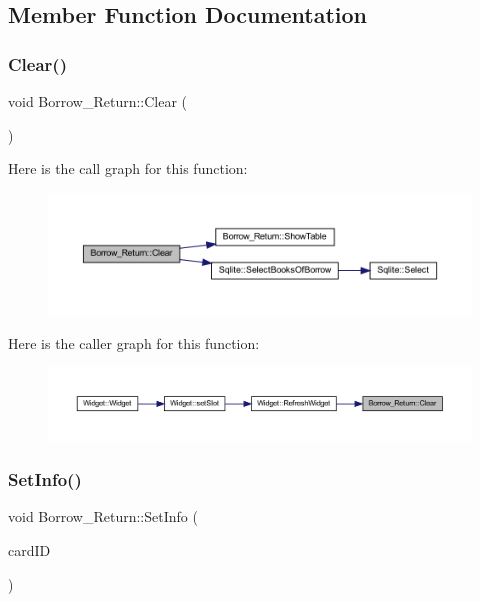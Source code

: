 \subsection{Member Function Documentation}
\mbox{\label{class_borrow___return_a65b8b7b7c224f0747c4330fb9aa6fdce}} 
\subsubsection{\texorpdfstring{Clear()}{Clear()}}
{\footnotesize\ttfamily void Borrow\+\_\+\+Return\+::\+Clear (\begin{DoxyParamCaption}{ }\end{DoxyParamCaption})}

Here is the call graph for this function\+:
\nopagebreak
\begin{figure}[H]
\begin{center}
\leavevmode
\includegraphics[width=350pt]{class_borrow___return_a65b8b7b7c224f0747c4330fb9aa6fdce_cgraph}
\end{center}
\end{figure}
Here is the caller graph for this function\+:
\nopagebreak
\begin{figure}[H]
\begin{center}
\leavevmode
\includegraphics[width=350pt]{class_borrow___return_a65b8b7b7c224f0747c4330fb9aa6fdce_icgraph}
\end{center}
\end{figure}
\mbox{\label{class_borrow___return_afd3bfd00077c0704c8b26f8e4254e176}} 
\subsubsection{\texorpdfstring{SetInfo()}{SetInfo()}}
{\footnotesize\ttfamily void Borrow\+\_\+\+Return\+::\+Set\+Info (\begin{DoxyParamCaption}\item[{Q\+String}]{card\+ID }\end{DoxyParamCaption})}


